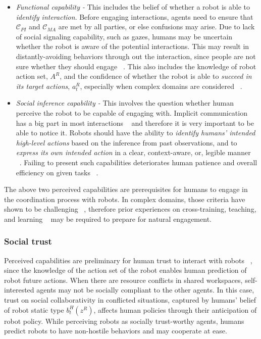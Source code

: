 \documentclass[letterpaper, 10 pt, conference]{ieeeconf}  %
\begin{document}
\begin{itemize}
	\item \textit{Functional capability - } This includes the belief of whether a robot is able to \textit{identify interaction}. Before engaging interactions, agents need to ensure that $\mathcal{C}_{PI}$ and $\mathcal{C}_{MA}$ are met by all parties, or else confusions may arise. Due to lack of social signaling capability, such as gazes, humans may be uncertain whether the robot is aware of the potential interactions. This may result in distantly-avoiding behaviors through out the interaction, since people are not sure whether they should engage ~\cite{dragan2015effects}. This also includes the knowledge of robot action set, $A^R$, and the confidence of whether the robot is able to \textit{succeed in its target actions}, $a^R_t$, especially when complex domains are considered ~\cite{chen2018planning}. 
	\item \textit{Social inference capability - } This involves the question whether human perceive the robot to be capable of engaging with. Implicit communication has a big part in most interactions ~\cite{knepper2017implicit} and therefore it is very important to be able to notice it. Robots should have the ability to \textit{identify humans' intended high-level actions} based on the inference from past observations, and to \textit{express its own intended action} in a clear, context-aware, or, legible manner ~\cite{dragan2013legibility}. Failing to present such capabilities deteriorates human patience and overall efficiency on given tasks ~\cite{cha2015perceived}. 
\end{itemize}

The above two perceived capabilities are prerequisites for humans to engage in the coordination process with robots. In complex domains, those criteria have shown to be challenging ~\cite{knepper2017implicit}, therefore prior experiences on cross-training, teaching, and learning ~\cite{zhang2017plan} may be required to prepare for natural engagement. 

\subsubsection{Social trust}%
Perceived capabilities are preliminary for human trust to interact with robots ~\cite{yang2017evaluating}, since the knowledge of the action set of the robot enables 
human prediction of robot future actions. When there are resource conflicts in shared workspaces, self-interested agents may not be socially compliant to the other agents. 
In this case, trust on social collaborativity in conflicted situations, captured by humans' belief of robot static type $b^H_t(z^R)$, affects human policies through their anticipation of robot policy. While perceiving robots as socially trust-worthy agents, humans predict robots to have non-hostile behaviors and may cooperate at ease.   
\end{document}

